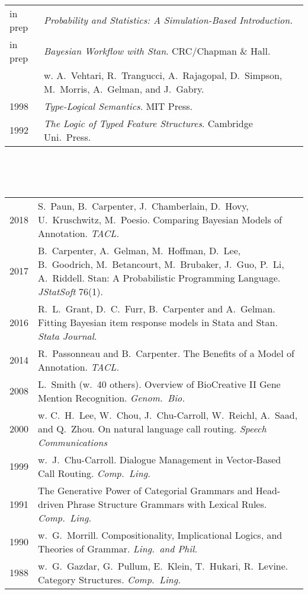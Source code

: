 \documentclass[10pt]{paper}
\newcommand{\heading}[1]{\noindent{\Large\bf\sffamily #1}\\[6pt]}
\newcommand{\publ}[2]{#1 & \begin{minipage}[t]{0.9\textwidth}#2\end{minipage}\\[4pt]}
\begin{document}
\heading{Books}
%
\begin{tabular}{ll}
in prep & {\sl\sffamily Probability and Statistics: A Simulation-Based Introduction.}
\\[6pt]
in prep & {\sl\sffamily Bayesian Workflow with Stan}.
CRC/Chapman \& Hall.
\\[2pt]
&  w. A.~Vehtari, R.~Trangucci, A.~Rajagopal,
               D.~Simpson, M.~Morris, A.~Gelman, and J.~Gabry.
\\[6pt]
1998 & {\sl\sffamily Type-Logical Semantics}. MIT Press.
\\[6pt]
1992 & {\sl\sffamily The Logic of Typed Feature Structures}. Cambridge Uni.\ Press.
\end{tabular}
\\[10pt]


\newpage

\heading{Journal Articles}
\begin{tabular}{ll}
  \publ{2018}{S.~Paun, B.~Carpenter, J.~Chamberlain, D.~Hovy,
  U.~Kruschwitz, M.~Poesio. Comparing Bayesian Models of
  Annotation. {\sl\sffamily TACL.}\vspace*{6pt}}
\publ{2017}{B.~Carpenter, A.~Gelman, M.~Hoffman, D.~Lee, B.~Goodrich,
  M.~Betancourt, M.~Brubaker, J.~Guo, P.~Li, A.~Riddell. Stan: A
  Probabilistic Programming Language. {\sl\sffamily JStatSoft} 76(1).\vspace*{6pt}}
\publ{2016}{R.~L.~Grant, D.~C.~Furr, B.~Carpenter and  A.~Gelman. Fitting Bayesian item
  response models in Stata and Stan. {\sl\sffamily Stata Journal}.\vspace*{6pt}}
\publ{2014}{R.~Passonneau and B.~Carpenter. The Benefits of a Model of
  Annotation. {\sl\sffamily TACL.}\vspace*{6pt}}
\publ{2008}{L.~Smith (w.\ 40 others). Overview of BioCreative II Gene
  Mention Recognition. {\sl\sffamily Genom.~Bio.}}\vspace*{6pt}
\publ{2000}{w. C.~H.~Lee, W.~Chou, J.~Chu-Carroll, W.~Reichl, A.~Saad,
  and Q.~Zhou.  On natural language call routing. {\sl\sffamily Speech Communications}}
\publ{1999}{w.\ J.\ Chu-Carroll. Dialogue Management in Vector-Based
  Call Routing. {\sl\sffamily Comp.\ Ling.}\vspace*{-2pt}}
\publ{1991}{The Generative Power of Categorial Grammars and
  Head-driven Phrase Structure Grammars with Lexical
  Rules. {\sl\sffamily Comp.\ Ling.}\vspace*{6pt}}
\publ{1990}{w.\ G.\ Morrill. Compositionality, Implicational Logics, and Theories of Grammar. {\sl\sffamily Ling.\ and Phil.}}
\publ{1988}{w.\ G.~Gazdar, G.~Pullum, E.~Klein, T.~Hukari, R.~Levine. Category Structures. {\sl\sffamily Comp.~Ling.}}
\end{tabular}
\vspace*{12pt}
\end{document}
